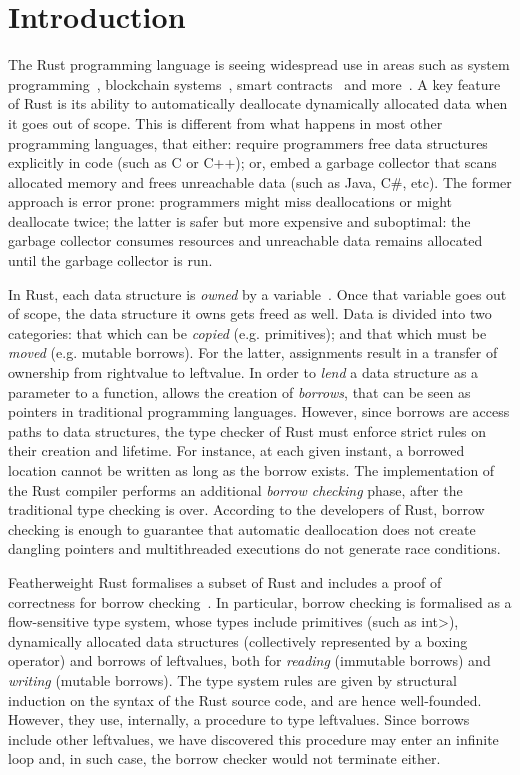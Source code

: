 \section{Introduction}\label{sec:introduction}

The Rust programming language is seeing widespread use in areas such
as system programming~\cite{ABGMMMS16,BBBPRR17,LCGPDL17}, blockchain
systems~\cite{HHHH18,NQ20}, smart contracts~\cite{Ash20,ZHCKHJJMS20}
and more~\cite{BHR18,AMPS19}.  A key feature of Rust is its ability to
automatically deallocate dynamically allocated data when it goes out
of scope. This is different from what happens in most other
programming languages, that either: require programmers free data
structures explicitly in code (such as C or C++); or, embed a garbage
collector that scans allocated memory and frees unreachable data (such
as Java, C\#, etc).  The former approach is error prone: programmers
might miss deallocations or might deallocate twice; the latter is
safer but more expensive and suboptimal: the garbage collector
consumes resources and unreachable data remains allocated until the
garbage collector is run.

In Rust, each data structure is \emph{owned} by a
variable~\cite{RustBook}. Once that variable goes out of scope, the
data structure it owns gets freed as well.  Data is divided into two
categories: that which can be {\em copied} (e.g. primitives); and that
which must be {\em moved} (e.g. mutable borrows).  For the latter,
assignments result in a transfer of ownership from rightvalue to
leftvalue.  In order to \emph{lend} a data structure as a parameter to
a function,  allows the creation of
\emph{borrows}, that can be seen as pointers in traditional
programming languages.  However, since borrows are access paths to
data structures, the type checker of Rust must enforce strict rules on
their creation and lifetime. For instance, at each given instant, a
borrowed location cannot be written as long as the borrow exists.  The
implementation of the Rust compiler performs an additional
\emph{borrow checking} phase, after the traditional type checking is
over.  According to the developers of Rust, borrow checking is enough
to guarantee that automatic deallocation does not create dangling
pointers and multithreaded executions do not generate race conditions.

Featherweight Rust formalises a subset of Rust and includes a proof of
correctness for borrow checking~\cite{Pearce21}.  In particular,
borrow checking is formalised as a flow-sensitive type system, whose
types include primitives (such as \<int>), dynamically allocated data
structures (collectively represented by a boxing operator) and borrows
of leftvalues, both for {\em reading} (immutable borrows) and {\em
  writing} (mutable borrows). The type system rules are given by
structural induction on the syntax of the Rust source code, and are
hence well-founded. However, they use, internally, a procedure to type
leftvalues. Since borrows include other leftvalues, we have discovered
this procedure may enter an infinite loop and, in such case, the
borrow checker would not terminate either.

